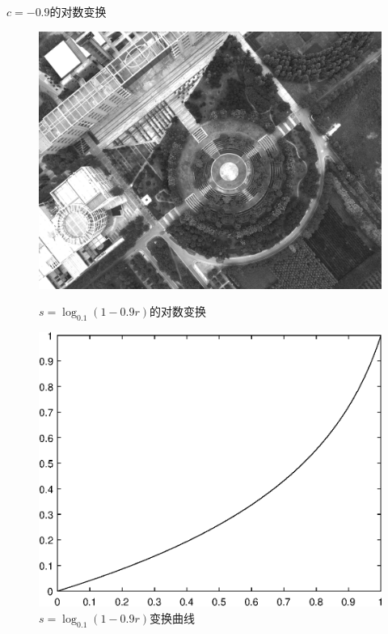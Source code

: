 $c=-0.9$的对数变换
\begin{figure}[H]
	\centering
	\begin{minipage}{0.45\linewidth}
		\includegraphics[width=\linewidth]{figure/DJI_0027_Log_-90.png}
		\caption{$s=\log_{0.1}(1-0.9r)$的对数变换}
	\end{minipage}
	\begin{minipage}{0.45\linewidth}
		\includegraphics[width=\linewidth]{figure/DJI_0027_Log_-90_Graph.eps}
		\caption{$s=\log_{0.1}(1-0.9r)$变换曲线}
	\end{minipage}
\end{figure}